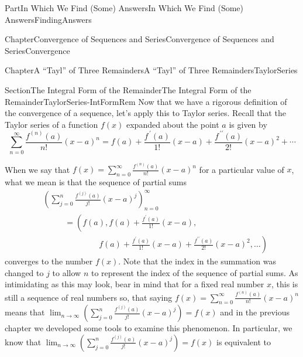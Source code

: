 \documentclass[oneside,10pt,]{book}
\numberwithin{equation}{part}
\def\limitt#1#2#3{{\displaystyle\lim_{#1\rightarrow #2}\textstyle #3}}
\newcommand{\amp}{&}
\begin{document}
\begin{partptx}{Part}{In Which We Find (Some) Answers}{}{In Which We Find (Some) Answers}{}{}{FindingAnswers}
\begin{chapterptx}{Chapter}{Convergence of Sequences and Series}{}{Convergence of Sequences and Series}{}{}{Convergence}
\end{chapterptx}
%
%
\typeout{************************************************}
\typeout{************************************************}
%
\begin{chapterptx}{Chapter}{A ``Tayl'' of Three Remainders}{}{A ``Tayl'' of Three Remainders}{}{}{TaylorSeries}
\renewcommand*{\chaptername}{Chapter}
%
%
\typeout{************************************************}
\typeout{************************************************}
%
\begin{sectionptx}{Section}{The Integral Form of the Remainder}{}{The Integral Form of the Remainder}{}{}{TaylorSeries-IntFormRem}
%
Now that we have a rigorous definition of the convergence of a sequence, let's apply this to Taylor series.  Recall that the Taylor series of a function \(f(x)\) expanded about the point \(a\) is given by%
\begin{equation*}
\sum_{n=0}^\infty\frac{f^{(n)}(a)}{n!}(x-a)^n=f(a)+\frac{f^{\,\prime}(a)}{1!}(x-a)+\frac{f^{\,\prime\prime}(a)}{2!}(x-a)^2+\cdots
\end{equation*}
%
\par
When we say that \(f(x)=\sum_{n=0}^\infty\frac{f^{(n)}(a)}{n!}(x-a)^n\) for a particular value of \(x\), what we mean is that the sequence of partial sums%
\begin{align*}
\amp{} \left(\sum_{j=0}^n\frac{f^{(j)}(a)}{j!}(x-a)^j\right)_{n=0}^\infty\\
\amp{}\ \ \ \ \ \ \ \ \ \ \ \  = \left(f(a),
f(a)+\frac{f^{\prime}(a)}{1!}(x-a),\right. \\
\amp{}\ \ \ \ \ \ \ \ \ \ \ \ \ \ \ \ \ \ \ \ \ \ \ \ \ \ \ \ \ \ \ \left.{}f(a) +\frac{f^{\prime}(a)}{1!}(x-a)+\frac{f^{\prime\prime}(a)}{2!}(x-a)^2,\ldots\right)
\end{align*}
converges to the number \(f(x)\). Note that the index in the summation was changed to \(j\) to allow \(n\) to represent the index of the sequence of partial sums. As intimidating as this may look, bear in mind that for a fixed real number \(x\), this is still a sequence of real numbers so, that saying \(f(x)=\sum_{n=0}^\infty\frac{f^{(n)}(a)}{n!}(x-a)^n\) means that \(\limitt{n}{\infty}{\left(\sum_{j=0}^n\frac{f^{(j)}(a)}{j!}(x-a)^j\right)}=f(x)\) and in the previous chapter we developed some tools to examine this phenomenon. In particular, we know that \(\limitt{n}{\infty}{\left(\sum_{j=0}^n\frac{f^{(j)}(a)}{j!}(x-a)^j\right)}=f(x)\) is equivalent to%

\end{sectionptx}
\end{chapterptx}
\end{partptx}
\end{document}
